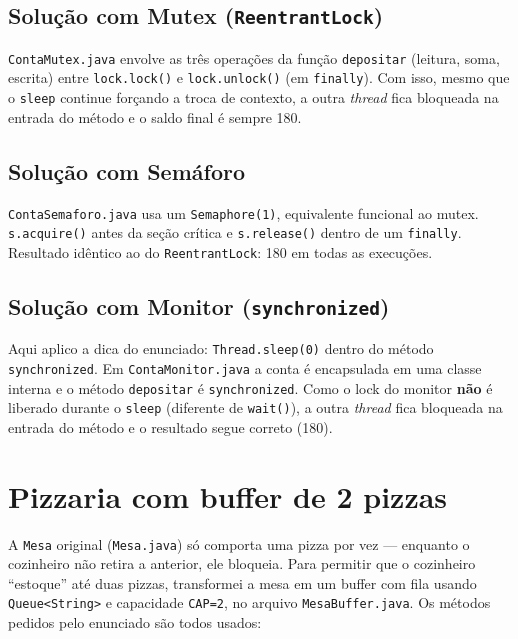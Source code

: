 \subsection{Solução com Mutex (\texttt{ReentrantLock})}

\texttt{ContaMutex.java} envolve as três operações da função
\texttt{depositar} (leitura, soma, escrita) entre \texttt{lock.lock()} e
\texttt{lock.unlock()} (em \texttt{finally}). Com isso, mesmo que o
\texttt{sleep} continue forçando a troca de contexto, a outra
\textit{thread} fica bloqueada na entrada do método e o saldo final é
sempre 180.

\subsection{Solução com Semáforo}

\texttt{ContaSemaforo.java} usa um \texttt{Semaphore(1)}, equivalente
funcional ao mutex. \texttt{s.acquire()} antes da seção crítica e
\texttt{s.release()} dentro de um \texttt{finally}. Resultado idêntico ao
do \texttt{ReentrantLock}: 180 em todas as execuções.

\subsection{Solução com Monitor (\texttt{synchronized})}

Aqui aplico a dica do enunciado: \texttt{Thread.sleep(0)} dentro do método
\texttt{synchronized}. Em \texttt{ContaMonitor.java} a conta é
encapsulada em uma classe interna e o método \texttt{depositar} é
\texttt{synchronized}. Como o lock do monitor \textbf{não} é liberado
durante o \texttt{sleep} (diferente de \texttt{wait()}), a outra
\textit{thread} fica bloqueada na entrada do método e o resultado segue
correto (180).

\section{Pizzaria com buffer de 2 pizzas}

A \texttt{Mesa} original (\texttt{Mesa.java}) só comporta uma pizza por
vez --- enquanto o cozinheiro não retira a anterior, ele bloqueia. Para
permitir que o cozinheiro ``estoque'' até duas pizzas, transformei a
mesa em um buffer com fila usando \texttt{Queue<String>} e capacidade
\texttt{CAP=2}, no arquivo \texttt{MesaBuffer.java}. Os métodos pedidos
pelo enunciado são todos usados:

